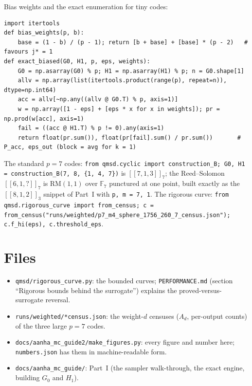 \documentclass[11pt]{article}
\newcommand{\code}[1]{\texttt{#1}}
\newcommand{\F}{\mathbb{F}}
\begin{document}
Bias weights and the exact enumeration for tiny codes:
\begin{lstlisting}
import itertools
def bias_weights(p, b):
    base = (1 - b) / (p - 1); return [b + base] + [base] * (p - 2)   # favours j* = 1
def exact_biased(G0, H1, p, eps, weights):
    G0 = np.asarray(G0) % p; H1 = np.asarray(H1) % p; n = G0.shape[1]
    allv = np.array(list(itertools.product(range(p), repeat=n)), dtype=np.int64)
    acc = allv[~np.any((allv @ G0.T) % p, axis=1)]
    w = np.array([1 - eps] + [eps * x for x in weights]); pr = np.prod(w[acc], axis=1)
    fail = ((acc @ H1.T) % p != 0).any(axis=1)
    return float(pr.sum()), float(pr[fail].sum() / pr.sum())       # P_acc, eps_out (block = avg for k = 1)
\end{lstlisting}
The standard $p=7$ codes: \code{from qmsd.cyclic import construction\_B;
G0, H1 = construction\_B(7, 8, \{1, 4, 7\})} is $[[7,1,3]]_7$; the Reed--Solomon
$[[6,1,{?}]]_7$ is RM$(1,1)$ over $\F_7$ punctured at one point, built exactly as the
$[[8,1,2]]_3$ snippet of Part~I with \code{p, m = 7, 1}. The rigorous curve:
\code{from qmsd.rigorous\_curve import from\_census; c =
from\_census("runs/weighted/p7\_m4\_sphere\_1756\_260\_7\_census.json"); c.f\_hi(eps),
c.threshold\_eps}.

\section{Files}
\begin{itemize}[nosep]
\item \code{qmsd/rigorous\_curve.py}: the bounded curves; \code{PERFORMANCE.md}
  (section ``Rigorous bounds behind the surrogate'') explains the proved-versus-surrogate
  reversal.
\item \code{runs/weighted/*census.json}: the weight-$d$ censuses ($A_d$, per-output
  counts) of the three large $p=7$ codes.
\item \code{docs/aanha\_mc\_guide2/make\_figures.py}: every figure and number here;
  \code{numbers.json} has them in machine-readable form.
\item \code{docs/aanha\_mc\_guide/}: Part~I (the sampler walk-through, the exact
  engine, building $G_0$ and $H_1$).
\end{itemize}
\end{document}
